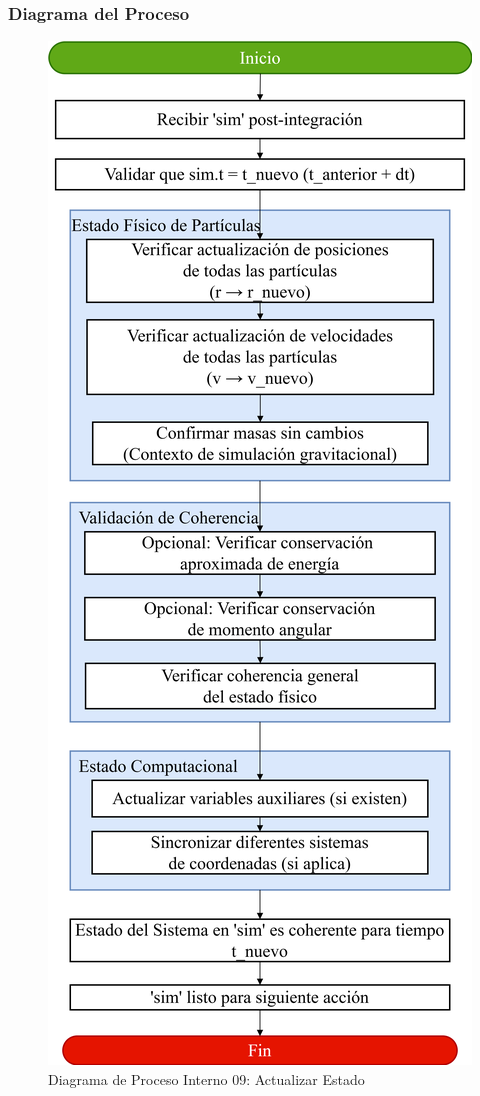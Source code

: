 \subsubsection{Diagrama del Proceso}
\begin{figure}[H]
    \centering
    \includegraphics[width=\textwidth]{img/Analisis/DiagramaProcesos/DiagramaProceso09_ActualizarEstado.png}
    \caption{Diagrama de Proceso Interno 09: Actualizar Estado}%
    \label{fig:process_diagram09}
\end{figure}
